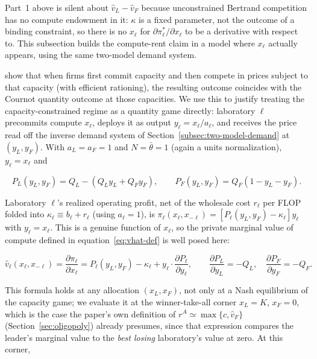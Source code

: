 \documentclass[11pt]{article}
\begin{document}
Part~1 above is silent about $\widehat v_L-\widehat v_F$ because unconstrained Bertrand competition has no compute endowment in it: $\kappa$ is a fixed parameter, not the outcome of a binding constraint, so there is no $x_\ell$ for $\partial\pi^*_\ell/\partial x_\ell$ to be a derivative with respect to. This subsection builds the compute-rent claim in a model where $x_\ell$ actually appears, using the same two-model demand system.

\citet{krepsScheinkman1983} show that when firms first commit capacity and then compete in prices subject to that capacity (with efficient rationing), the resulting outcome coincides with the Cournot quantity outcome at those capacities. We use this to justify treating the capacity-constrained regime as a quantity game directly: laboratory $\ell$ precommits compute $x_\ell$, deploys it as output $y_\ell=x_\ell/a_\ell$, and receives the price read off the inverse demand system of Section~\ref{subsec:two-model-demand} at $(y_L,y_F)$. With $a_L=a_F=1$ and $N=\bar\theta=1$ (again a units normalization), $y_\ell=x_\ell$ and

\begin{equation}P_L(y_L,y_F)=Q_L-(Q_L y_L+Q_F y_F),\qquad P_F(y_L,y_F)=Q_F(1-y_L-y_F).\end{equation}

Laboratory $\ell$'s realized operating profit, net of the wholesale cost $r_\ell$ per FLOP folded into $\kappa_\ell\equiv b_\ell+r_\ell$ (using $a_\ell=1$), is $\pi_\ell(x_\ell,x_{-\ell})=\left[P_\ell(y_L,y_F)-\kappa_\ell\right]y_\ell$ with $y_\ell=x_\ell$. This is a genuine function of $x_\ell$, so the private marginal value of compute defined in equation~\eqref{eq:vhat-def} is well posed here:

\begin{equation}\widehat v_\ell(x_\ell,x_{-\ell})=\frac{\partial\pi_\ell}{\partial x_\ell}=P_\ell(y_L,y_F)-\kappa_\ell+y_\ell\cdot\frac{\partial P_\ell}{\partial y_\ell},\qquad \frac{\partial P_L}{\partial y_L}=-Q_L,\quad\frac{\partial P_F}{\partial y_F}=-Q_F.\end{equation}

This formula holds at any allocation $(x_L,x_F)$, not only at a Nash equilibrium of the capacity game; we evaluate it at the winner-take-all corner $x_L=K$, $x_F=0$, which is the case the paper's own definition of $r^A\simeq\max\{c,\widehat v_F\}$ (Section~\ref{sec:oligopoly}) already presumes, since that expression compares the leader's marginal value to the \emph{best losing} laboratory's value at zero. At this corner,
\end{document}
